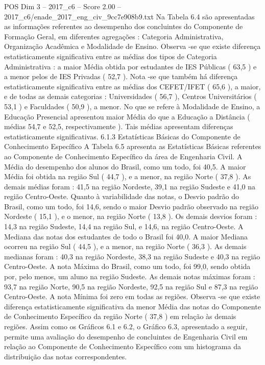 \begin{textsample}{POS Dim 3 – 2017\_c6 – Score 2.00 – 2017\_c6/enade\_2017\_eng\_civ\_9cc7e908b9.txt}
Na Tabela 6.4 são apresentadas as informações referentes ao desempenho dos concluintes do Componente de Formação Geral, em diferentes agregações : Categoria Administrativa, Organização Acadêmica e Modalidade de Ensino.
Observa -se que existe diferença estatisticamente significativa entre as médias dos tipos de Categoria Administrativa : a maior Média obtida por estudantes de IES Públicas ( 63,5 ) e a menor pelos de IES Privadas ( 52,7 ).
Nota -se que também há diferença estatisticamente significativa entre as médias dos CEFET/IFET ( 65,6 ), a maior, e de todas as demais categorias : Universidades ( 56,7 ), Centros Universitários ( 53,1 ) e Faculdades ( 50,9 ), a menor.
No que se refere à Modalidade de Ensino, a Educação Presencial apresentou maior Média do que a Educação a Distância ( médias 54,7 e 52,5, respectivamente ).
Tais médias apresentam diferenças estatisticamente significativas. 6.1.3 Estatísticas Básicas do Componente de Conhecimento Específico A Tabela 6.5 apresenta as Estatísticas Básicas referentes ao Componente de Conhecimento Específico da área de Engenharia Civil.
A Média do desempenho dos alunos do Brasil, como um todo, foi 40,5.
A maior Média foi obtida na região Sul ( 44,7 ), e a menor, na região Norte ( 37,8 ).
As demais médias foram : 41,5 na região Nordeste, 39,1 na região Sudeste e 41,0 na região Centro-Oeste.
Quanto à variabilidade das notas, o Desvio padrão do Brasil, como um todo, foi 14,6, sendo o maior Desvio padrão observado na região Nordeste ( 15,1 ), e o menor, na região Norte ( 13,8 ).
Os demais desvios foram : 14,3 na região Sudeste, 14,4 na região Sul, e 14,6, na região Centro-Oeste.
A Mediana das notas dos estudantes de todo o Brasil foi 40,0.
A maior Mediana ocorreu na região Sul ( 44,5 ), e a menor, na região Norte ( 36,3 ).
As demais medianas foram : 40,3 na região Nordeste, 38,3 na região Sudeste e 40,3 na região Centro-Oeste.
A nota Máxima do Brasil, como um todo, foi 99,0, sendo obtida por, pelo menos, um aluno na região Sudeste.
As demais notas máximas foram : 93,7 na região Norte, 90,5 na região Nordeste, 92,5 na região Sul e 87,3 na região Centro-Oeste.
A nota Mínima foi zero em todas as regiões.
Observa -se que existe diferença estatisticamente significativa da menor Média das notas do Componente de Conhecimento Específico da região Norte ( 37,8 ) em relação às demais regiões.
Assim como os Gráficos 6.1 e 6.2, o Gráfico 6.3, apresentado a seguir, permite uma avaliação do desempenho de concluintes de Engenharia Civil em relação ao Componente de Conhecimento Específico com um histograma da distribuição das notas correspondentes.

\end{textsample}
